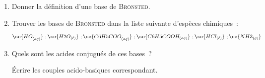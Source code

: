 \begin{enumerate}
    \item Donner la définition d'une base de \textsc{Brönsted}.
    \item Trouver les bases de \textsc{Brönsted} dans la liste suivante
          d'espèces chimiques~:
          \[
              \ce{HO^{-}_{(aq)}}~; \ce{H2O_{(\ell)}}~; \ce{C6H5COO^{-}_{(aq)}}~;
              \ce{C6H5COOH_{(aq)}}~; \ce{HCl_{(\ell)}}~; \ce{NH3_{(g)}}
          \]
    \item Quels sont les acides conjugués de ces bases~?

          Écrire les couples acido-basiques correspondant.
\end{enumerate}


